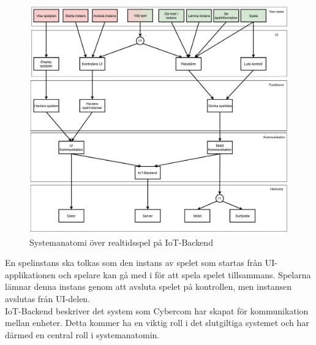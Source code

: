 \documentclass[10pt]{article}
\begin{document}
		\begin{figure}[h]
			\centering
			\includegraphics[scale=0.4]{systemanatomi_graf}
			\caption{Systemanatomi över realtidsspel på IoT-Backend}
			\label{fig:graf}
		\end{figure}
	\pagebreak
	En spelinstans ska tolkas som den instans av spelet som startas från UI-applikationen och spelare kan gå med i för att spela spelet tillsammans. Spelarna lämnar denna instans genom att avsluta spelet på kontrollen, men instansen avslutas från UI-delen.\\

	IoT-Backend beskriver det system som Cybercom har skapat för kommunikation mellan enheter. Detta kommer ha en viktig roll i det slutgiltiga systemet och har därmed en central roll i systemanatomin.\\
\end{document}
